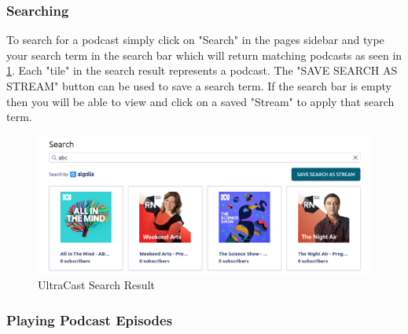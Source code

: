 \documentclass[../report.tex]{subfiles}
\begin{document}
\subsubsection{Searching}

To search for a podcast simply click on "Search" in the pages sidebar and type your search term in the search bar
which will return matching podcasts as seen in \cref{fig:UM_search_result}. Each "tile" in the search result represents
a podcast. The "SAVE SEARCH AS STREAM" button can be used to save a search term. If the search bar is empty then you 
will be able to view and click on a saved "Stream" to apply that search term.

\begin{figure}[ht] 
    \centering
    \includegraphics[width=16cm]{resources/UM_Search_Result}
    \caption{UltraCast Search Result}
    \label{fig:UM_search_result} 
\end{figure}

\newpage


\subsubsection{Playing Podcast Episodes} \label{sssec:UM_playing_episodes}
\end{document}
